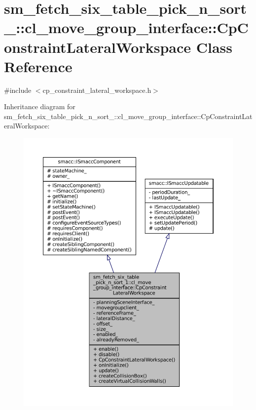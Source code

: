 \hypertarget{classsm__fetch__six__table__pick__n__sort__1_1_1cl__move__group__interface_1_1CpConstraintLateralWorkspace}{}\section{sm\+\_\+fetch\+\_\+six\+\_\+table\+\_\+pick\+\_\+n\+\_\+sort\+\_\+:\+:cl\+\_\+move\+\_\+group\+\_\+interface\+:\+:Cp\+Constraint\+Lateral\+Workspace Class Reference}
\label{classsm__fetch__six__table__pick__n__sort__1_1_1cl__move__group__interface_1_1CpConstraintLateralWorkspace}


{\ttfamily \#include $<$cp\+\_\+constraint\+\_\+lateral\+\_\+workspace.\+h$>$}



Inheritance diagram for sm\+\_\+fetch\+\_\+six\+\_\+table\+\_\+pick\+\_\+n\+\_\+sort\+\_\+:\+:cl\+\_\+move\+\_\+group\+\_\+interface\+:\+:Cp\+Constraint\+Lateral\+Workspace\+:
\nopagebreak
\begin{figure}[H]
\begin{center}
\leavevmode
\includegraphics[width=350pt]{classsm__fetch__six__table__pick__n__sort__1_1_1cl__move__group__interface_1_1CpConstraintLateralWorkspace__inherit__graph}
\end{center}
\end{figure}


